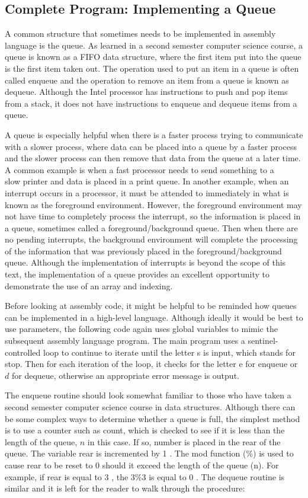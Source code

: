 \documentclass[10pt]{book}
\begin{document}
\subsection{Complete Program: Implementing a Queue}
A common structure that sometimes needs to be implemented in assembly language is the queue. As learned in a second semester computer science course, a queue is known as a FIFO data structure, where the first item put into the queue is the first item taken out. The operation used to put an item in a queue is often called enqueue and the operation to remove an item from a queue is known as dequeue. Although the Intel processor has instructions to push and pop items from a stack, it does not have instructions to enqueue and dequeue items from a queue.

A queue is especially helpful when there is a faster process trying to communicate with a slower process, where data can be placed into a queue by a faster process and the slower process can then remove that data from the queue at a later time. A common example is when a fast processor needs to send something to a\\
slow printer and data is placed in a print queue. In another example, when an interrupt occurs in a processor, it must be attended to immediately in what is known as the foreground environment. However, the foreground environment may not have time to completely process the interrupt, so the information is placed in a queue, sometimes called a foreground/background queue. Then when there are no pending interrupts, the background environment will complete the processing of the information that was previously placed in the foreground/background queue. Although the implementation of interrupts is beyond the scope of this text, the implementation of a queue provides an excellent opportunity to demonstrate the use of an array and indexing.


Before looking at assembly code, it might be helpful to be reminded how queues can be implemented in a high-level language. Although ideally it would be best to use parameters, the following code again uses global variables to mimic the subsequent assembly language program. The main program uses a sentinel-controlled loop to continue to iterate until the letter s is input, which stands for stop. Then for each iteration of the loop, it checks for the letter e for enqueue or $d$ for dequeue, otherwise an appropriate error message is output.

The enqueue routine should look somewhat familiar to those who have taken a second semester computer science course in data structures. Although there can be some complex ways to determine whether a queue is full, the simplest method is to use a counter such as count, which is checked to see if it is less than the length of the queue, $n$ in this case. If so, number is placed in the rear of the queue. The variable rear is incremented by 1 . The mod function (\%) is used to cause rear to be reset to 0 should it exceed the length of the queue (n). For example, if rear is equal to 3 , the $3 \% 3$ is equal to 0 . The dequeue routine is similar and it is left for the reader to walk through the procedure:
\end{document}
